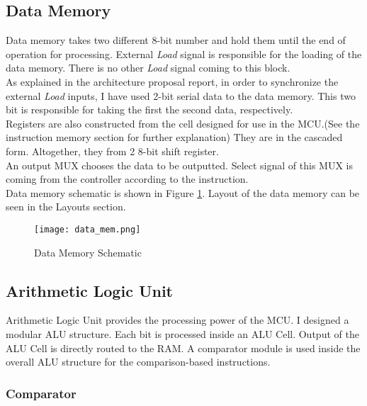 \documentclass[12pt]{article}
\begin{document}
\subsection*{Data Memory}

Data memory takes two different 8-bit number and hold them until the end of operation for processing. External \textsl{Load} signal is responsible for the loading of the data memory. There is no other \textsl{Load} signal coming to this block.\\

As explained in the architecture proposal report, in order to synchronize the external \textsl{Load} inputs, I have used 2-bit serial data to the data memory. This two bit is responsible for taking the first the second data, respectively.\\

Registers are also constructed from the cell designed for use in the MCU.(See the instruction memory section for further explanation) They are in the cascaded form. Altogether, they from 2 8-bit shift register.\\

An output MUX chooses the data to be outputted. Select signal of this MUX is coming from the controller according to the instruction.\\

Data memory schematic is shown in Figure \ref{data_mem_sch}. Layout of the data memory can be seen in the Layouts section. 

\begin{figure}[H]
\centering
\texttt{[image: data\_mem.png]}
\caption{Data Memory Schematic}
\label{data_mem_sch}
\end{figure}










\newpage
\subsection*{Arithmetic Logic Unit}

Arithmetic Logic Unit provides the processing power of the MCU. I designed a modular ALU structure. Each bit is processed inside an ALU Cell. Output of the ALU Cell is directly routed to the RAM. A comparator module is used inside the overall ALU structure for the comparison-based instructions.

\subsubsection*{Comparator}
\end{document}
